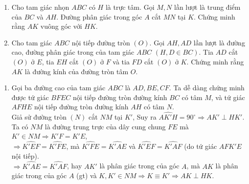 \begin{ex}%
    \begin{enumerate}
    	\item Cho tam giác nhọn $ABC$ có $H$ là trực tâm. Gọi $M, N$ lần lượt là trung điểm của $BC$ và $AH$. Đường phân giác trong góc $A$ cắt $MN$ tại $K$. Chứng minh rằng $AK$ vuông góc với $HK$. 
    	\item Cho tam giác $ABC$ nội tiếp đường tròn $(O)$. Gọi $AH, AD$ lần lượt là đường cao, đường phân giác trong của tam giác $ABC$ $(H, D\in BC)$. Tia $AD$ cắt $(O)$ ở $E$, tia $EH$ cắt $(O)$ ở $F$ và tia $FD$ cắt $(O)$ ở $K$. Chứng minh rằng $AK$ là đường kính của đường tròn tâm $O$. 
    \end{enumerate}
\loigiai
    {\begin{center}
    	\end{center}
   \begin{enumerate}
   		\item
   	    	 Gọi ba đường cao của tam giác $ABC$ là $AD, BE, CF$. Ta dễ dàng chứng minh được tứ giác $BFEC$ nội tiếp đường tròn đường kính $BC$ có tâm $M$, và tứ giác $AFHE$ nội tiếp đường tròn đường kính $AH$ có tâm $N$.\\
   	Giả sử đường tròn $(N)$ cắt $NM$ tại $K'$, Suy ra $\widehat{AK'H}= 90^\circ \Rightarrow AK' \perp HK'$.\\
   	Ta có $NM$ là đường trung trực của dây cung chung $FE$ mà $K'\in NM \Rightarrow K'F=K'E$,\\
   	$ \Rightarrow \widehat{K'EF}= \widehat{K'FE}$, mà $\widehat{K'FE}= \widehat{K'AE}$ và $\widehat{K'EF}= \widehat{K'AF}$ (do tứ giác $AFK'E$ nội tiếp).\\
   	$\Rightarrow \widehat{K'AE}= \widehat{K'AF}$, hay $AK'$ là phân giác trong của góc $A$, mà $AK$ là phân giác trong của góc $A$ (gt) và $K, K'\in NM \Rightarrow K\equiv K' \Rightarrow AK \perp HK$.
   		

\end{enumerate}}
\end{ex}
